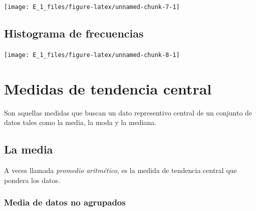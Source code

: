 \documentclass[10pt,]{krantz}
\newenvironment{Shaded}{\begin{snugshade}}{\end{snugshade}}
\newcommand{\DataTypeTok}[1]{\textcolor[rgb]{0.13,0.29,0.53}{#1}}
\newcommand{\DecValTok}[1]{\textcolor[rgb]{0.00,0.00,0.81}{#1}}
\newcommand{\KeywordTok}[1]{\textcolor[rgb]{0.13,0.29,0.53}{\textbf{#1}}}
\newcommand{\NormalTok}[1]{#1}
\newcommand{\OperatorTok}[1]{\textcolor[rgb]{0.81,0.36,0.00}{\textbf{#1}}}
\newcommand{\StringTok}[1]{\textcolor[rgb]{0.31,0.60,0.02}{#1}}
\theoremstyle{definition}
\theoremstyle{definition}
\theoremstyle{definition}
\theoremstyle{definition}
\theoremstyle{remark}
\begin{document}
\begin{center}\texttt{[image: E\_1\_files/figure-latex/unnamed-chunk-7-1]} \end{center}

\hypertarget{histograma-de-frecuencias-1}{%
\section{Histograma de frecuencias}\label{histograma-de-frecuencias-1}}

\begin{Shaded}
\end{Shaded}

\begin{center}\texttt{[image: E\_1\_files/figure-latex/unnamed-chunk-8-1]} \end{center}

\hypertarget{medidas-de-tendencia-central}{%
\chapter{Medidas de tendencia central}\label{medidas-de-tendencia-central}}

Son aquellas medidas que buscan un dato representivo central de un conjunto de datos tales como la media, la moda y la mediana.

\hypertarget{la-media}{%
\section{La media}\label{la-media}}

A veces llamada \emph{promedio aritmético}, es la medida de tendencia central que pondera los datos.

\hypertarget{media-de-datos-no-agrupados}{%
\subsection{Media de datos no agrupados}\label{media-de-datos-no-agrupados}}
\end{document}
